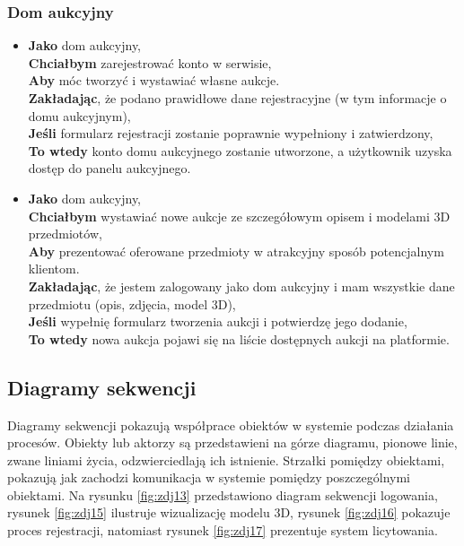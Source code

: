 \subsubsection{Dom aukcyjny}
\begin{itemize}
    \item \textbf{Jako} dom aukcyjny,\\
          \textbf{Chciałbym} zarejestrować konto w serwisie, \\
          \textbf{Aby} móc tworzyć i wystawiać własne aukcje.\\
          \textbf{Zakładając}, że podano prawidłowe dane rejestracyjne (w tym informacje o domu aukcyjnym),\\
          \textbf{Jeśli} formularz rejestracji zostanie poprawnie wypełniony i zatwierdzony,\\
          \textbf{To wtedy} konto domu aukcyjnego zostanie utworzone, a użytkownik uzyska dostęp do panelu aukcyjnego.\\



    \item \textbf{Jako} dom aukcyjny,\\
          \textbf{Chciałbym} wystawiać nowe aukcje ze szczegółowym opisem i modelami 3D przedmiotów, \\
          \textbf{Aby} prezentować oferowane przedmioty w atrakcyjny sposób potencjalnym klientom.\\
          \textbf{Zakładając}, że jestem zalogowany jako dom aukcyjny i mam wszystkie dane przedmiotu (opis, zdjęcia, model 3D),\\
          \textbf{Jeśli} wypełnię formularz tworzenia aukcji i potwierdzę jego dodanie, \\
          \textbf{To wtedy} nowa aukcja pojawi się na liście dostępnych aukcji na platformie.
\end{itemize}

\subsection{Diagramy sekwencji}
Diagramy sekwencji pokazują współprace obiektów w systemie podczas działania procesów. Obiekty lub aktorzy są przedstawieni na górze diagramu, pionowe linie, zwane liniami życia, odzwierciedlają ich istnienie. Strzałki pomiędzy obiektami, pokazują jak zachodzi komunikacja w systemie pomiędzy poszczególnymi obiektami. Na rysunku \ref{fig:zdj13} przedstawiono diagram sekwencji logowania, rysunek \ref{fig:zdj15} ilustruje wizualizację modelu 3D, rysunek \ref{fig:zdj16} pokazuje proces rejestracji, natomiast rysunek \ref{fig:zdj17} prezentuje system licytowania.

